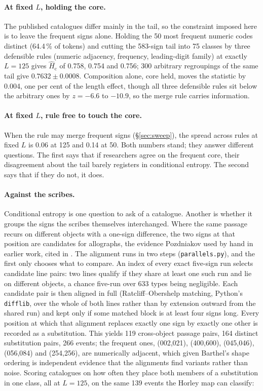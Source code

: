 \documentclass[11pt,a4paper]{article}
\newcommand{\Hcn}{\hat H_{\mathrm{c}}}
\begin{document}
\paragraph{At fixed $L$, holding the core.} The published catalogues differ mainly in the tail, so the constraint imposed here is to leave the frequent signs alone. Holding the 50 most frequent numeric codes distinct (64.4\,\% of tokens) and cutting the 583-sign tail into 75 classes by three defensible rules (numeric adjacency, frequency, leading-digit family) at exactly $L=125$ gives $\Hcn$ of 0.758, 0.754 and 0.756; 300 arbitrary regroupings of the same tail give $0.7632\pm0.0008$. Composition alone, core held, moves the statistic by 0.004, one per cent of the length effect, though all three defensible rules sit below the arbitrary ones by $z=-6.6$ to $-10.9$, so the merge rule carries information.

\paragraph{At fixed $L$, rule free to touch the core.} When the rule may merge frequent signs (\S\ref{sec:sweep}), the spread across rules at fixed $L$ is 0.06 at 125 and 0.14 at 50. Both numbers stand; they answer different questions. The first says that if researchers agree on the frequent core, their disagreement about the tail barely registers in conditional entropy. The second says that if they do not, it does.

\paragraph{Against the scribes.} Conditional entropy is one question to ask of a catalogue. Another is whether it groups the signs the scribes themselves interchanged. Where the same passage recurs on different objects with a one-sign difference, the two signs at that position are candidates for allographs, the evidence Pozdniakov used by hand in earlier work, cited in \citet{pozdniakov2007}. The alignment runs in two steps (\texttt{parallels.py}), and the first only chooses what to compare. An index of every exact five-sign run selects candidate line pairs: two lines qualify if they share at least one such run and lie on different objects, a chance five-run over 633 types being negligible. Each candidate pair is then aligned in full (Ratcliff--Obershelp matching, Python's \texttt{difflib}, over the whole of both lines rather than by extension outward from the shared run) and kept only if some matched block is at least four signs long. Every position at which that alignment replaces exactly one sign by exactly one other is recorded as a substitution. This yields 119 cross-object passage pairs, 164 distinct substitution pairs, 266 events; the frequent ones, (002,021), (400,600), (045,046), (056,084) and (254,256), are numerically adjacent, which given Barthel's shape ordering is independent evidence that the alignments find variants rather than noise. Scoring catalogues on how often they place both members of a substitution in one class, all at $L=125$, on the same 139 events the Horley map can classify:
\end{document}
